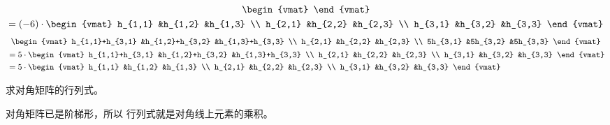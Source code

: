 \begin{exercises}
\begin{answer}
\begin{exparts}
\begin{multline*}
\begin{vmat}
            \end{vmat}                                  \\
            =
            (-6)\cdot
            \begin{vmat}
             h_{1,1}   &h_{1,2}  &h_{1,3} \\
             h_{2,1}   &h_{2,2}  &h_{2,3} \\
             h_{3,1}   &h_{3,2}  &h_{3,3}
            \end{vmat}
          \end{multline*}
        \partsitem 
          \begin{multline*}
          \begin{vmat}
            h_{1,1}+h_{3,1}  &h_{1,2}+h_{3,2} &h_{1,3}+h_{3,3} \\
            h_{2,1}          &h_{2,2}         &h_{2,3} \\
            5h_{3,1}         &5h_{3,2}        &5h_{3,3}
          \end{vmat}                                                 \\
          \begin{aligned}
          &=
          5\cdot     
          \begin{vmat}
            h_{1,1}+h_{3,1}  &h_{1,2}+h_{3,2} &h_{1,3}+h_{3,3} \\
            h_{2,1}          &h_{2,2}         &h_{2,3} \\
            h_{3,1}          &h_{3,2}         &h_{3,3}
          \end{vmat}                                     \\
          &=5\cdot
          \begin{vmat}
            h_{1,1}          &h_{1,2}         &h_{1,3} \\
            h_{2,1}          &h_{2,2}         &h_{2,3} \\
            h_{3,1}          &h_{3,2}         &h_{3,3}
          \end{vmat}
          \end{aligned}
          \end{multline*}
      \end{exparts}  
     \end{answer}
  \recommended \item 
    求对角矩阵的行列式。
    \begin{answer}
       对角矩阵已是阶梯形，所以
       行列式就是对角线上元素的乘积。
    \end{answer}

\end{exercises}

